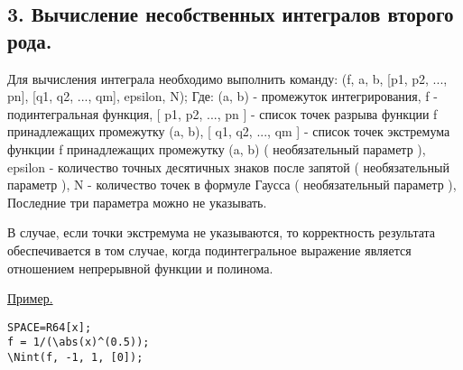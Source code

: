 


\subsection{3. Вычисление несобственных интегралов второго рода.}
Для вычисления интеграла необходимо выполнить команду:
\NInt(f, a, b, [p1, p2, ..., pn], [q1, q2, ..., qm], epsilon, N);
Где:
(a, b) - промежуток интегрирования,
f - подинтегральная функция,
[ p1, p2, ..., pn ] - список точек разрыва функции f принадлежащих промежутку (a, b),
[ q1, q2, ..., qm ] - список точек экстремума функции f принадлежащих промежутку (a, b)
 ( необязательный параметр ),
epsilon - количество точных десятичных знаков после запятой ( необязательный параметр ),
N - количество точек в формуле Гаусса ( необязательный параметр ),
Последние три параметра можно не указывать.

В случае, если точки экстремума не указываются, то корректность результата обеспечивается в том случае,
когда подинтегральное выражение является отношением непрерывной функции и полинома.


\underline{Пример. }

\vspace*{-2mm}
\begin{verbatim}
SPACE=R64[x];
f = 1/(\abs(x)^(0.5));
\Nint(f, -1, 1, [0]); 
\end{verbatim}


